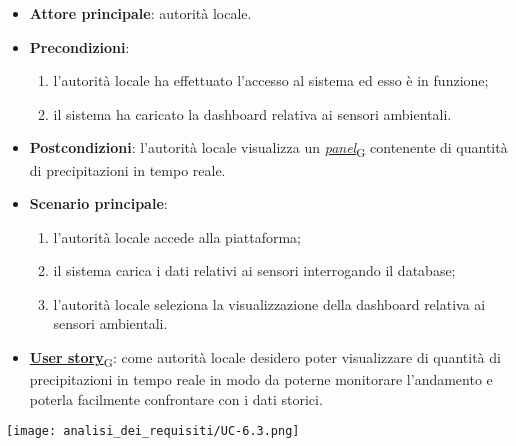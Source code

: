 \begin{itemize}
	\item \textbf{Attore principale}: autorità locale.
	\item \textbf{Precondizioni}:
	      \begin{enumerate}
		      \item l'autorità locale ha effettuato l'accesso al sistema ed esso è in funzione;
		      \item il sistema ha caricato la dashboard relativa ai sensori ambientali.
	      \end{enumerate}
	\item \textbf{Postcondizioni}: l'autorità locale visualizza un \href{https://7last.github.io/docs/rtb/documentazione-interna/glossario\#panel}{\textit{panel}\textsubscript{G}} contenente di quantità di precipitazioni in tempo reale.
	\item \textbf{Scenario principale}:
	      \begin{enumerate}
		      \item l'autorità locale accede alla piattaforma;
		      \item il sistema carica i dati relativi ai sensori interrogando il database;
		      \item l'autorità locale seleziona la visualizzazione della dashboard relativa ai sensori ambientali.
	      \end{enumerate}
	\item \href{https://7last.github.io/docs/rtb/documentazione-interna/glossario\#user-story}{\textbf{User story}\textsubscript{G}}:
	      come autorità locale desidero poter visualizzare di quantità di precipitazioni in tempo reale in modo da poterne monitorare l'andamento
	      e poterla facilmente confrontare con i dati storici.
\end{itemize}
\begin{center}
	\texttt{[image: analisi\_dei\_requisiti/UC-6.3.png]}
\end{center}


